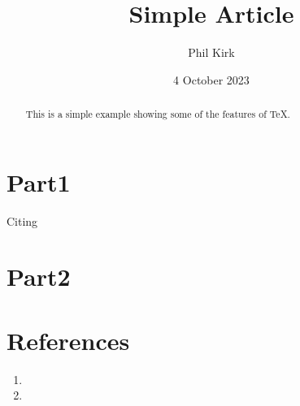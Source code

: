 \documentclass{article}
\title{Simple Article}
\author{Phil Kirk}
\date{4 October 2023}
\begin{document}
\maketitle
\begin{abstract}
    This is a simple example showing some of the features
    of TeX.
\end{abstract}
\tableofcontents
\section{Part1}
Citing\cite{einstein}
\section{Part2}
\kant[20]

\section{References}
\kant[40]

\kant[39]

\begin{enumerate}
\item {}

\kant[41]

\item {}

\kant[43]

\end{enumerate}
\end{document}
